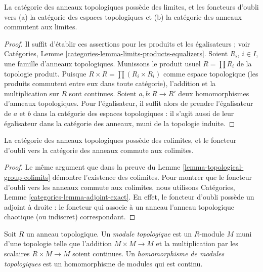 \begin{lemma}
\label{lemma-topological-ring-limits}
La catégorie des anneaux topologiques possède des limites, et les foncteurs
d'oubli vers (a) la catégorie des espaces topologiques et (b) la catégorie des
anneaux commutent aux limites.
\end{lemma}

\begin{proof}
Il suffit d'établir ces assertions pour les produits et les égalisateurs ;
voir Catégories, Lemme
\ref{categories-lemma-limits-products-equalizers}. Soient $R_i$, $i \in I$,
une famille d'anneaux topologiques. Munissons le produit usuel
$R = \prod R_i$ de la topologie produit. Puisque
$R \times R = \prod (R_i \times R_i)$ comme espace topologique (les produits
commutent entre eux dans toute catégorie), l'addition et la multiplication
sur $R$ sont continues. Soient $a, b : R \to R'$ deux homomorphismes
d'anneaux topologiques. Pour l'égalisateur, il suffit alors de prendre
l'égalisateur de $a$ et $b$ dans la catégorie des espaces topologiques : il
s'agit aussi de leur égalisateur dans la catégorie des anneaux, muni de la
topologie induite.
\end{proof}

\begin{lemma}
\label{lemma-topological-ring-colimits}
La catégorie des anneaux topologiques possède des colimites, et le foncteur
d'oubli vers la catégorie des anneaux commute aux colimites.
\end{lemma}

\begin{proof}
Le même argument que dans la preuve du
Lemme \ref{lemma-topological-group-colimits} démontre l'existence des
colimites. Pour montrer que le foncteur d'oubli vers les anneaux commute aux
colimites, nous utilisons Catégories, Lemme
\ref{categories-lemma-adjoint-exact}. En effet, le foncteur d'oubli possède un
adjoint à droite : le foncteur qui associe à un anneau l'anneau topologique
chaotique (ou indiscret) correspondant.
\end{proof}

\begin{definition}
\label{definition-topological-module}
Soit $R$ un anneau topologique. Un {\it module topologique} est un $R$-module
$M$ muni d'une topologie telle que l'addition $M \times M \to M$ et la
multiplication par les scalaires $R \times M \to M$ soient continues.
Un {\it homomorphisme de modules topologiques} est un homomorphisme de modules
qui est continu.
\end{definition}


